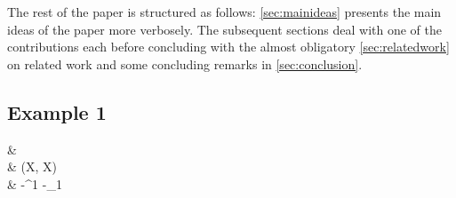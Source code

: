 The rest of the paper is structured as follows: \cref{sec:mainideas} presents the main ideas of the paper more verbosely. The subsequent sections deal with one of the contributions each before concluding with the almost obligatory \cref{sec:relatedwork} on related work and some concluding remarks in \cref{sec:conclusion}.

\subsection{Example 1}

\begin{codealign}
  &
    \identity
    \prd
    \FunXX\
    \by
  \\[-3pt]
  &\quad
    \Apply(\prd X, \con X)
    \colon
  \\[-3pt]
  &\quad\quad
    \FunXX\textsc{-}\Apply^{1}
    \mkCmd
    \FunXX\textsc{-}\Apply_{1}
\end{codealign}
